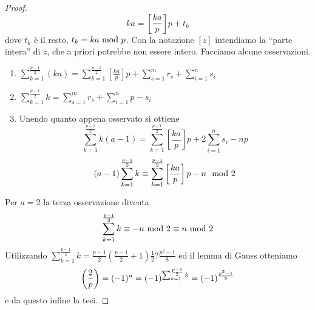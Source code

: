 \begin{proof}
	\begin{equation*}
	ka=\left[\frac{ka}{p}\right]p+t_k
	\end{equation*}
	dove $t_k$ è il resto, $t_k=ka\ \mathrm{mod}\ p$. Con la notazione $\left[z\right]$ intendiamo la \enquote{parte intera} di $z$, che a priori potrebbe non essere intero. Facciamo alcune osservazioni.
	\begin{enumerate}
		\item $\displaystyle \sum_{k=1}^{\frac{p-1}{2}}(ka)=\sum_{k=1}^{\frac{p-1}{2}}\left[\frac{ka}{p}\right]p+\sum_{s=1}^{m}r_s+\sum_{i=1}^{n}s_i$
		\item $\displaystyle\sum_{k=1}^{\frac{p-1}{2}}k=\sum_{s=1}^{m}r_s+\sum_{i=1}^{n}p-s_i $ 
		\item Unendo quanto appena osservato si ottiene
		\begin{equation*}
		\sum_{k=1}^{\frac{p-1}{2}}k(a-1)=\sum_{k=1}^{\frac{p-1}{2}}\left[\frac{ka}{p}\right]p+2\sum_{i=1}^{n}s_i-np
		\end{equation*}
		\begin{equation*}
		(a-1)\sum_{k=1}^{\frac{p-1}{2}}k\equiv\sum_{k=1}^{\frac{p-1}{2}}\left[\frac{ka}{p}\right]p-n \ \ \mathrm{mod}\ 2
		\end{equation*}
	\end{enumerate}
	Per $a=2$ la terza osservazione diventa 
	\begin{equation*}
	\sum_{k=1}^{\frac{p-1}{2}}k\equiv-n\ \mathrm{mod}\ 2\equiv n\ \mathrm{mod}\ 2
	\end{equation*}
	Utilizzando $\sum_{k=1}^{\frac{p-1}{2}}k=\frac{p-1}{2}\left(\frac{p-1}{2}+1\right)\frac{1}{2}?\frac{p^2-1}{8} $ ed il lemma di Gauss otteniamo
	\begin{equation*}
	\left(\frac{2}{p}\right)=(-1)^n=(-1)^{\sum_{k=1}^{\frac{p-1}{2}}k}=(-1)^{\frac{p^2-1}{8}}
	\end{equation*}
	e da questo infine la tesi.
\end{proof}
